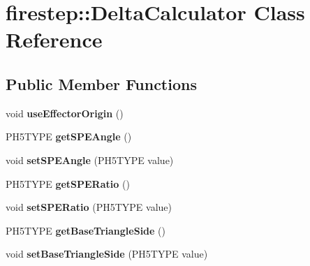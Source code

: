 \hypertarget{classfirestep_1_1_delta_calculator}{\section{firestep\+:\+:Delta\+Calculator Class Reference}
\label{classfirestep_1_1_delta_calculator}
}
\subsection*{Public Member Functions}
\begin{DoxyCompactItemize}
\item 
\hypertarget{classfirestep_1_1_delta_calculator_afd2931d77363742bcedc7f586cfa3a3d}{void {\bfseries use\+Effector\+Origin} ()}\label{classfirestep_1_1_delta_calculator_afd2931d77363742bcedc7f586cfa3a3d}

\item 
\hypertarget{classfirestep_1_1_delta_calculator_afd71c76e9b8b70ddf7cdf891b4b3d7ee}{P\+H5\+T\+Y\+P\+E {\bfseries get\+S\+P\+E\+Angle} ()}\label{classfirestep_1_1_delta_calculator_afd71c76e9b8b70ddf7cdf891b4b3d7ee}

\item 
\hypertarget{classfirestep_1_1_delta_calculator_abb18feeb2c250e799e9c71aedad71505}{void {\bfseries set\+S\+P\+E\+Angle} (P\+H5\+T\+Y\+P\+E value)}\label{classfirestep_1_1_delta_calculator_abb18feeb2c250e799e9c71aedad71505}

\item 
\hypertarget{classfirestep_1_1_delta_calculator_af31ec5dee5c123d12518f45d529c4270}{P\+H5\+T\+Y\+P\+E {\bfseries get\+S\+P\+E\+Ratio} ()}\label{classfirestep_1_1_delta_calculator_af31ec5dee5c123d12518f45d529c4270}

\item 
\hypertarget{classfirestep_1_1_delta_calculator_a051a7aef0069976aba1ba779585453d6}{void {\bfseries set\+S\+P\+E\+Ratio} (P\+H5\+T\+Y\+P\+E value)}\label{classfirestep_1_1_delta_calculator_a051a7aef0069976aba1ba779585453d6}

\item 
\hypertarget{classfirestep_1_1_delta_calculator_a7cc6478571082d9793e783107f624c6f}{P\+H5\+T\+Y\+P\+E {\bfseries get\+Base\+Triangle\+Side} ()}\label{classfirestep_1_1_delta_calculator_a7cc6478571082d9793e783107f624c6f}

\item 
\hypertarget{classfirestep_1_1_delta_calculator_a4075f7bf5c79550f6dc3c3eb73b5e655}{void {\bfseries set\+Base\+Triangle\+Side} (P\+H5\+T\+Y\+P\+E value)}\label{classfirestep_1_1_delta_calculator_a4075f7bf5c79550f6dc3c3eb73b5e655}


\end{DoxyCompactItemize}
